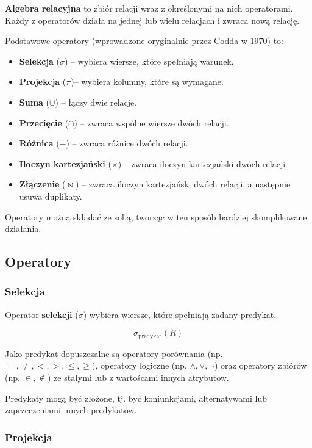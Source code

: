 \textbf{Algebra relacyjna} to zbiór relacji wraz z określonymi na nich operatorami.
Każdy z operatorów działa na jednej lub wielu relacjach i zwraca nową relację.

Podstawowe operatory (wprowadzone oryginalnie przez Codda w 1970) to:
\begin{itemize}
    \item \textbf{Selekcja} (\( \sigma \)) -- wybiera wiersze, które spełniają warunek.
    \item \textbf{Projekcja} (\( \pi \))-- wybiera kolumny, które są wymagane.
    \item \textbf{Suma} (\( \cup \)) -- łączy dwie relacje.
    \item \textbf{Przecięcie} (\( \cap \)) -- zwraca wspólne wiersze dwóch relacji.
    \item \textbf{Różnica} (\( - \)) -- zwraca różnicę dwóch relacji.
    \item \textbf{Iloczyn kartezjański} (\( \times \)) -- zwraca iloczyn kartezjański dwóch relacji.
    \item \textbf{Złączenie} (\( \bowtie \)) -- zwraca iloczyn kartezjański dwóch relacji, a następnie usuwa duplikaty.
\end{itemize}

Operatory można składać ze sobą, tworząc w ten sposób bardziej skomplikowane działania.

\subsection*{Operatory}

\subsubsection*{Selekcja}

Operator \textbf{selekcji} (\( \sigma \)) wybiera wiersze, które spełniają zadany predykat.

\[
    \sigma_{\text{predykat}}(R)
\]

Jako predykat dopuszczalne są operatory porównania (np. \( =, \neq, <, >, \leq, \geq \)), operatory logiczne (np. \( \land, \lor, \lnot \)) oraz operatory zbiórów (np. \( \in, \notin \)) ze stałymi lub z wartoścami innych atrybutow.

Predykaty mogą być złożone, tj. być koniunkcjami, alternatywami lub zaprzeczeniami innych predykatów.

\subsubsection*{Projekcja}

